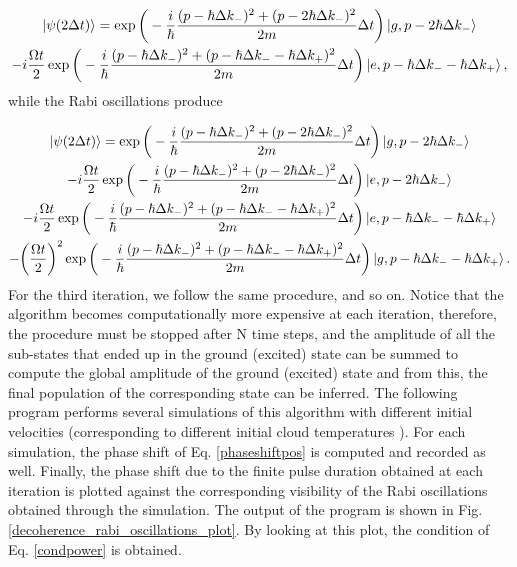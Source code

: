 \documentclass{article}
\begin{document}
\begin{multline*}
    \ket{\psi (2 \Delta t)}= \exp \bigg( -\frac{i}{\hbar} \frac{(p-\hbar \Delta k_{-})^{2} + (p-2\hbar \Delta k_{-})^{2}}{2m} \Delta t \bigg)\ket{g, p-2\hbar \Delta k_{-}}
    \\ - i \frac{\Omega t}{2} \exp \bigg( -\frac{i}{\hbar} \frac{(p-\hbar \Delta k_{-})^{2} + (p-\hbar \Delta k_{-} -\hbar \Delta k_{+})^{2}}{2m} \Delta t \bigg)\ket{e, p-\hbar \Delta k_{-} -\hbar \Delta k_{+}},
\end{multline*}
%
while the Rabi oscillations produce

\begin{multline*}
    \ket{\psi (2 \Delta t)} = \exp \bigg( -\frac{i}{\hbar} \frac{(p-\hbar \Delta k_{-})^{2} + (p-2\hbar \Delta k_{-})^{2}}{2m} \Delta t \bigg)\ket{g, p-2\hbar \Delta k_{-}}
    \\ - i \frac{\Omega t}{2} \exp \bigg( -\frac{i}{\hbar} \frac{(p-\hbar \Delta k_{-})^{2} + (p-2\hbar \Delta k_{-})^{2}}{2m} \Delta t \bigg)\ket{e, p-2\hbar \Delta k_{-}}
    \\ - i \frac{\Omega t}{2} \exp \bigg( -\frac{i}{\hbar} \frac{(p-\hbar \Delta k_{-})^{2} + (p-\hbar \Delta k_{-} -\hbar \Delta k_{+})^{2}}{2m} \Delta t \bigg)\ket{e, p-\hbar \Delta k_{-} -\hbar \Delta k_{+}}
    \\ - \bigg(\frac{\Omega t}{2}\bigg)^2 \exp \bigg( -\frac{i}{\hbar} \frac{(p-\hbar \Delta k_{-})^{2} + (p-\hbar \Delta k_{-} -\hbar \Delta k_{+})^{2}}{2m} \Delta t \bigg)\ket{g, p-\hbar \Delta k_{-} -\hbar \Delta k_{+}}.
\end{multline*}
%
For the third iteration, we follow the same procedure, and so on. Notice that the algorithm becomes computationally more expensive at each iteration, therefore, the procedure must be stopped after N time steps, and the amplitude of all the sub-states that ended up in the ground (excited) state can be summed to compute the global amplitude of the ground (excited) state and from this, the final population of the corresponding state can be inferred. The following program performs several simulations of this algorithm with different initial velocities (corresponding to different initial cloud temperatures \cite{edgarMagneticGravimeter}). For each simulation, the phase shift of Eq. \ref{phaseshiftpos} is computed and recorded as well. Finally, the phase shift due to the finite pulse duration obtained at each iteration is plotted against the corresponding visibility of the Rabi oscillations obtained through the simulation. The output of the program is shown in Fig. \ref{decoherence_rabi_oscillations_plot}. By looking at this plot, the condition of Eq. \ref{condpower} is obtained.
\end{document}
